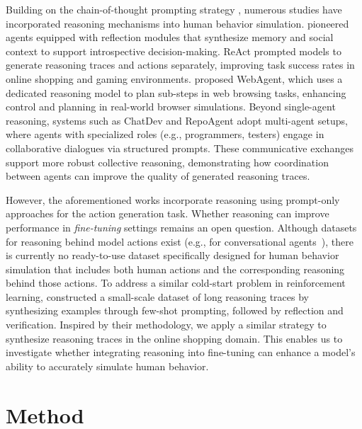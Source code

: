 \documentclass[11pt]{article}
\begin{document}
Building on the chain-of-thought prompting strategy \cite{weiChainofThoughtPromptingElicits2023}, numerous studies have incorporated reasoning mechanisms into human behavior simulation.  
\citet{parkGenerativeAgentsInteractive2023} pioneered agents equipped with reflection modules that synthesize memory and social context to support introspective decision-making. 
ReAct \cite{yaoReActSynergizingReasoning2023} prompted models to generate reasoning traces and actions separately, improving task success rates in online shopping and gaming environments.  
\citet{gurRealWorldWebAgentPlanning2023} proposed WebAgent, which uses a dedicated reasoning model to plan sub-steps in web browsing tasks, enhancing control and planning in real-world browser simulations.  
Beyond single-agent reasoning, systems such as ChatDev \cite{qianChatDevCommunicativeAgents2024} and RepoAgent \cite{luoRepoAgentLLMPoweredOpenSource2024} adopt multi-agent setups, where agents with specialized roles (e.g., programmers, testers) engage in collaborative dialogues via structured prompts. These communicative exchanges support more robust collective reasoning, demonstrating how coordination between agents can improve the quality of generated reasoning traces.

However, the aforementioned works incorporate reasoning using prompt-only approaches for the action generation task. Whether reasoning can improve performance in \textit{fine-tuning} settings remains an open question.
Although datasets for reasoning behind model actions exist (e.g., for conversational agents~\citep{dongreReSpActHarmonizingReasoning2025}), there is currently no ready-to-use dataset specifically designed for human behavior simulation that includes both human actions and the corresponding reasoning behind those actions.
To address a similar cold-start problem in reinforcement learning, \citet{deepseek-aiDeepSeekR1IncentivizingReasoning2025} constructed a small-scale dataset of long reasoning traces by synthesizing examples through few-shot prompting, followed by reflection and verification. Inspired by their methodology, we apply a similar strategy to synthesize reasoning traces in the online shopping domain. This enables us to investigate whether integrating reasoning into fine-tuning can enhance a model's ability to accurately simulate human behavior.


\section{Method}
\end{document}
